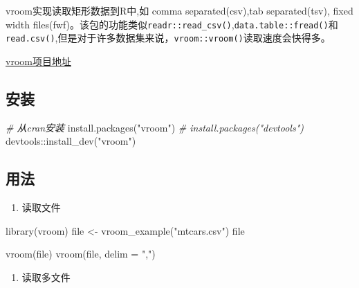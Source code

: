 \documentclass[
]{book}
\newenvironment{Shaded}{\begin{snugshade}}{\end{snugshade}}
\newcommand{\AttributeTok}[1]{\textcolor[rgb]{0.77,0.63,0.00}{#1}}
\newcommand{\CommentTok}[1]{\textcolor[rgb]{0.56,0.35,0.01}{\textit{#1}}}
\newcommand{\FunctionTok}[1]{\textcolor[rgb]{0.00,0.00,0.00}{#1}}
\newcommand{\NormalTok}[1]{#1}
\newcommand{\OtherTok}[1]{\textcolor[rgb]{0.56,0.35,0.01}{#1}}
\newcommand{\SpecialCharTok}[1]{\textcolor[rgb]{0.00,0.00,0.00}{#1}}
\newcommand{\StringTok}[1]{\textcolor[rgb]{0.31,0.60,0.02}{#1}}
\providecommand{\tightlist}{%
  \setlength{\itemsep}{0pt}\setlength{\parskip}{0pt}}
\begin{document}
vroom实现读取矩形数据到R中,如 comma separated(csv),tab separated(tsv), fixed width files(fwf)。该包的功能类似\texttt{readr::read\_csv()},\texttt{data.table::fread()}和\texttt{read.csv()},但是对于许多数据集来说，\texttt{vroom::vroom()}读取速度会快得多。

\href{https://vroom.r-lib.org/index.html}{vroom项目地址}

\hypertarget{ux5b89ux88c5}{%
\subsection{安装}\label{ux5b89ux88c5}}

\begin{Shaded}
\begin{Highlighting}[]
\CommentTok{\# 从cran安装}
\FunctionTok{install.packages}\NormalTok{(}\StringTok{"vroom"}\NormalTok{)}
\CommentTok{\# install.packages("devtools")}
\NormalTok{devtools}\SpecialCharTok{::}\FunctionTok{install\_dev}\NormalTok{(}\StringTok{"vroom"}\NormalTok{)}
\end{Highlighting}
\end{Shaded}

\hypertarget{ux7528ux6cd5}{%
\subsection{用法}\label{ux7528ux6cd5}}

\begin{enumerate}
\def\labelenumi{\arabic{enumi}.}
\tightlist
\item
  读取文件
\end{enumerate}

\begin{Shaded}
\begin{Highlighting}[]
\FunctionTok{library}\NormalTok{(vroom)}
\NormalTok{file }\OtherTok{\textless{}{-}} \FunctionTok{vroom\_example}\NormalTok{(}\StringTok{"mtcars.csv"}\NormalTok{)}
\NormalTok{file}

\FunctionTok{vroom}\NormalTok{(file)}
\FunctionTok{vroom}\NormalTok{(file, }\AttributeTok{delim =} \StringTok{","}\NormalTok{)}
\end{Highlighting}
\end{Shaded}

\begin{enumerate}
\def\labelenumi{\arabic{enumi}.}
\setcounter{enumi}{1}
\tightlist
\item
  读取多文件
\end{enumerate}
\end{document}
